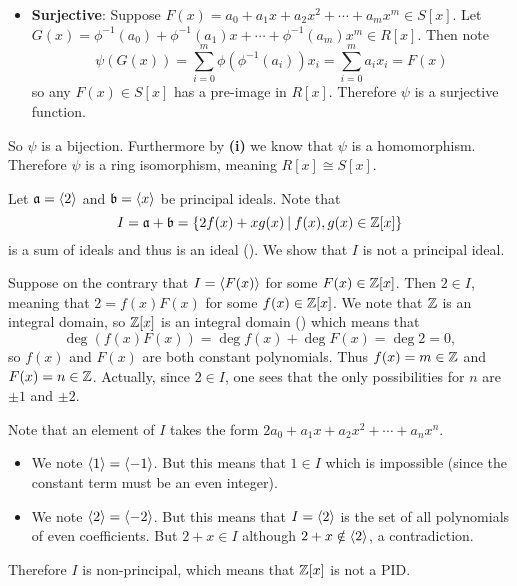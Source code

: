 \begin{questions}
\begin{partquestions}{\roman*}
\begin{itemize}
            \item \textbf{Surjective}: Suppose $F(x) = a_0 + a_1x + a_2x^2 + \cdots + a_mx^m \in S[x]$. Let $G(x) = \phi^{-1}(a_0) + \phi^{-1}(a_1)x + \cdots + \phi^{-1}(a_m)x^m \in R[x]$. Then note
            \[
                \psi(G(x)) = \sum_{i=0}^m\phi(\phi^{-1}(a_i))x_i = \sum_{i=0}^ma_ix_i = F(x)
            \]
            so any $F(x) \in S[x]$ has a pre-image in $R[x]$. Therefore $\psi$ is a surjective function.
        \end{itemize}

        So $\psi$ is a bijection. Furthermore by \textbf{(i)} we know that $\psi$ is a homomorphism. Therefore $\psi$ is a ring isomorphism, meaning $R[x] \cong S[x]$.
    \end{partquestions}
    
    \item Let $\mathfrak{a} = \left\langle2\right\rangle$ and $\mathfrak{b} = \left\langle x\right\rangle$ be principal ideals. Note that
    \[
        I = \ideal{a} + \ideal{b} = \{2f(x) + xg(x) \vert f(x),g(x) \in \Z[x]\}
    \]
    is a sum of ideals and thus is an ideal (). We show that $I$ is not a principal ideal.

    Suppose on the contrary that $I = \left\langle F(x)\right\rangle$ for some $F(x) \in \mathbb{Z}[x]$. Then $2 \in I$, meaning that $2 = f(x)F(x)$ for some $f(x) \in \mathbb{Z}[x]$. We note that $\mathbb{Z}$ is an integral domain, so $\mathbb{Z}[x]$ is an integral domain () which means that
    \[
        \deg(f(x)F(x)) = \deg f(x) + \deg F(x) = \deg 2 = 0,
    \]
    so $f(x)$ and $F(x)$ are both constant polynomials. Thus $f(x) = m \in \mathbb{Z}$ and $F(x) = n \in \mathbb{Z}$. Actually, since $2 \in I$, one sees that the only possibilities for $n$ are $\pm1$ and $\pm2$.

    Note that an element of $I$ takes the form $2a_0 + a_1x + a_2x^2 + \cdots + a_nx^n$.
    \begin{itemize}
        \item We note $\left\langle1\right\rangle = \left\langle-1\right\rangle$. But this means that $1 \in I$ which is impossible (since the constant term must be an even integer).
        \item We note $\left\langle2\right\rangle = \left\langle-2\right\rangle$. But this means that $I = \left\langle2\right\rangle$ is the set of all polynomials of even coefficients. But $2 + x \in I$ although $2 + x \notin \left\langle2\right\rangle$, a contradiction.
    \end{itemize}

    Therefore $I$ is non-principal, which means that $\mathbb{Z}[x]$ is not a PID.
\end{questions}
